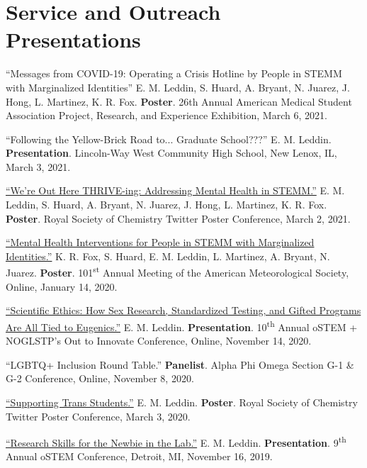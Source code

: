 \documentclass[letterpaper,11pt]{article}
\begin{document}
\section{Service and Outreach Presentations}
\begin{etaremune}
\small{
  \item \textnormal{``Messages from COVID-19: Operating a Crisis Hotline by People in STEMM with Marginalized Identities'' E. M. Leddin, S. Huard, A. Bryant, N. Juarez, J. Hong, L. Martinez, K. R. Fox. \textbf{Poster}. 26th Annual American Medical Student Association Project, Research, and Experience Exhibition, March 6, 2021.}
  \item \textnormal{``Following the Yellow-Brick Road to... Graduate School???'' E. M. Leddin. \textbf{Presentation}. Lincoln-Way West Community High School, New Lenox, IL, March 3, 2021.}
  \item \textnormal{\href{https://twitter.com/ThriveLifeline/status/1366720589130592259?s=20}{``We're Out Here THRIVE-ing: Addressing Mental Health in STEMM.''} E. M. Leddin, S. Huard, A. Bryant, N. Juarez, J. Hong, L. Martinez, K. R. Fox. \textbf{Poster}. Royal Society of Chemistry Twitter Poster Conference, March 2, 2021.}
  \item \textnormal{\href{https://bit.ly/2020-oSTEM-Ethics}{``Mental Health Interventions for People in STEMM with Marginalized Identities.''} K. R. Fox, S. Huard, E. M. Leddin, L. Martinez, A. Bryant, N. Juarez. \textbf{Poster}. 101\textsuperscript{st} Annual Meeting of the American Meteorological Society, Online, January 14, 2020.}
  \item \textnormal{\href{https://bit.ly/2020-oSTEM-Ethics}{``Scientific Ethics: How Sex Research, Standardized Testing, and Gifted Programs Are All Tied to Eugenics.''} E. M. Leddin. \textbf{Presentation}. 10\textsuperscript{th} Annual oSTEM + NOGLSTP's Out to Innovate\texttrademark{} Conference, Online, November 14, 2020.}
  \item \textnormal{``LGBTQ+ Inclusion Round Table.'' \textbf{Panelist}. Alpha Phi Omega Section G-1 \& G-2 Conference, Online, November 8, 2020.}
  \item \textnormal{\href{https://twitter.com/EmLedd1/status/1234812260515749889?s=20}{``Supporting Trans Students.''} E. M. Leddin. \textbf{Poster}. Royal Society of Chemistry Twitter Poster Conference, March 3, 2020.}
  \item \textnormal{\href{http://bit.ly/2019-oSTEM-PROF10}{``Research Skills for the Newbie in the Lab.''} E. M. Leddin. \textbf{Presentation}. 9\textsuperscript{th} Annual oSTEM Conference, Detroit, MI, November 16, 2019.}
}
\end{etaremune}
\end{document}
